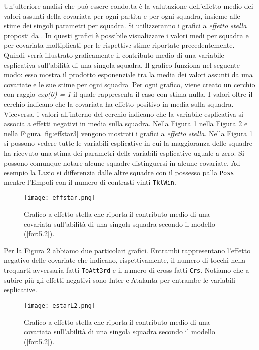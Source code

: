 Un'ulteriore analisi che può essere condotta è la valutazione dell'effetto medio dei valori assunti della covariata per ogni partita e per ogni squadra, insieme alle stime dei singoli parametri per squadra. Si utilizzeranno i grafici a \emph{effetto stella} proposti da \textcite{tutz2013visualization}. In questi grafici è possibile visualizzare i valori medi per squadra e per covariata moltiplicati per le rispettive stime riportate precedentemente. Quindi verrà illustrato graficamente il contributo medio di una variabile esplicativa sull'abilità di una singola squadra. Il grafico funziona nel seguente modo: esso mostra il prodotto esponenziale tra la media dei valori assunti da una covariate e le sue stime per ogni squadra. Per ogni grafico, viene creato un cerchio con raggio \emph{exp(0) = 1} il quale rappresenta il caso con stima nulla. I valori oltre il cerchio indicano che la covariata ha effetto positivo in media sulla squadra. Viceversa, i valori all'interno del cerchio indicano che la variabile esplicativa si associa a effetti negativi in media sulla squadra. Nella Figura \ref{fig:effstar1} nella Figura \ref{fig:effstar2} e nella Figura \ref{fig:effstar3} vengono mostrati i grafici a \emph{effetto stella}.
Nella Figura \ref{fig:effstar1} si possono vedere tutte le variabili esplicative in cui la maggioranza delle squadre ha ricevuto una stima dei parametri delle variabili esplicative   uguale a zero. Si possono comunque notare alcune squadre distinguersi in alcune covariate.
Ad esempio la Lazio si differenzia dalle altre squadre con il possesso palla \texttt{Poss} mentre l'Empoli con il numero di contrasti vinti \texttt{TklWin}.\\
\begin{figure}[htbp]
	\begin{center}
		\texttt{[image: effstar.png]}
		\caption{Grafico a effetto stella che riporta il contributo medio di una covariata sull'abilità di una singola squadra secondo il modello (\ref{for:5.2}).} \label{fig:effstar1}
	\end{center}
\end{figure}
Per la Figura \ref{fig:effstar2} abbiamo due particolari grafici. Entrambi rappresentano l'effetto negativo delle covariate che indicano, rispettivamente, il numero di tocchi nella trequarti avversaria fatti \texttt{ToAtt3rd} e il numero di cross fatti \texttt{Crs}. Notiamo che a subire più gli effetti negativi sono Inter e Atalanta per entrambe le variabili esplicative. 
\begin{figure}[htbp]
	\begin{center}
		\texttt{[image: estarL2.png]}
		\caption{Grafico a effetto stella che riporta il contributo medio di una covariata sull'abilità di una singola squadra secondo il modello (\ref{for:5.2}).} \label{fig:effstar2}
	\end{center}
\end{figure}
